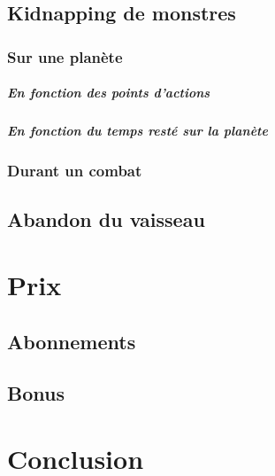 \documentclass[a4paper,11pt]{report}
\begin{document}
  \section{Kidnapping de monstres}
    \subsection{Sur une planète}
      \paragraph{En fonction des points d'actions}
      \paragraph{En fonction du temps resté sur la planète}
    \subsection{Durant un combat}
  \section{Abandon du vaisseau}
\chapter{Prix}
  \section{Abonnements}
  \section{Bonus}
\chapter{Conclusion}
\end{document}
